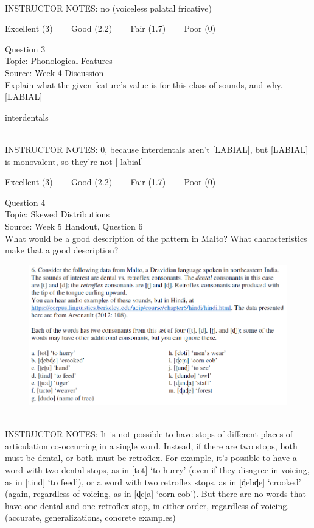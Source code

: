 \documentclass[12pt]{article}
\begin{document}
~\\
INSTRUCTOR NOTES: no (voiceless palatal fricative)


\vfill
Excellent (3) ~~~ Good (2.2) ~~~ Fair (1.7) ~~~ Poor (0)
\newpage

{\large Question 3}\\

Topic: Phonological Features\\
Source: Week 4 Discussion\\

Explain what the given feature’s value is for this class of sounds, and why.\\

{[LABIAL]}

interdentals


~\\
INSTRUCTOR NOTES: 0, because interdentals aren't [LABIAL], but [LABIAL] is monovalent, so they're not [-labial]


\vfill
Excellent (3) ~~~ Good (2.2) ~~~ Fair (1.7) ~~~ Poor (0)
\newpage

{\large Question 4}\\

Topic: Skewed Distributions\\
Source: Week 5 Handout, Question 6\\

What would be a good description of the pattern in Malto? What characteristics make that a good description?\\

\begin{figure}[H]
\includegraphics{../images/malto.png}
\end{figure}

~\\
INSTRUCTOR NOTES: It is not possible to have stops of different places of articulation co-occurring in a single word. Instead, if there are two stops, both must be dental, or both must be retroflex. For example, it’s possible to have a word with two dental stops, as in [tot] ‘to hurry’ (even if they disagree in voicing, as in [tind] ‘to feed’), or a word with two retroflex stops, as in [ɖebɖe] ‘crooked’ (again, regardless of voicing, as in [ɖeʈa] ‘corn cob’). But there are no words that have one dental and one retroflex stop, in either order, regardless of voicing. (accurate, generalizations, concrete examples)
\end{document}
